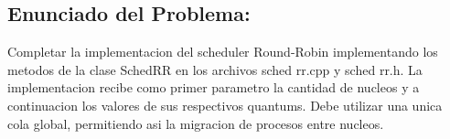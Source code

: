 \subsection{Enunciado del Problema:}

Completar la implementacion del scheduler Round-Robin implementando los metodos de la clase SchedRR en los archivos sched rr.cpp y sched rr.h. La implementacion recibe como primer parametro la cantidad de nucleos y a continuacion los valores de sus respectivos quantums. Debe utilizar una unica cola global, permitiendo asi la migracion de procesos entre nucleos.
